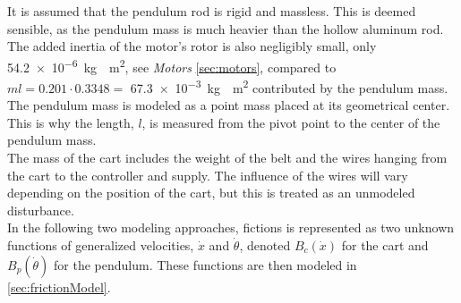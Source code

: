 It is assumed that the pendulum rod is rigid and massless. This is deemed sensible, as the pendulum mass is much heavier than the hollow aluminum rod. The added inertia of the motor's rotor is also negligibly small, only \SI{54.2e-6}{kg\cdot m^2}, see \textit{Motors} \autoref{sec:motors}, compared to $ml = 0.201 \cdot 0.3348=$ \SI{67.3e-3}{kg\cdot m^2} contributed by the pendulum mass. The pendulum mass is modeled as a point mass placed at its geometrical center. This is why the length, $l$, is measured from the pivot point to the center of the pendulum mass.\\
The mass of the cart includes the weight of the belt and the wires hanging from the cart to the controller and supply. The influence of the wires will vary depending on the position of the cart, but this is treated as an unmodeled disturbance.\\
In the following two modeling approaches, fictions is represented as two unknown functions of generalized velocities, $\dot{x}$ and $\dot{\theta}$, denoted $B_c(\dot{x})$ for the cart and $B_p(\dot{\theta})$ for the pendulum. These functions are then modeled in \autoref{sec:frictionModel}.



